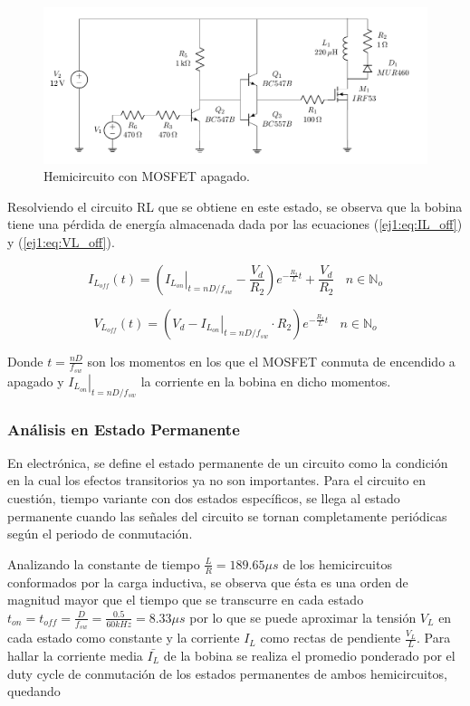 \begin{figure}[H]
	\centering
	\includegraphics[width=0.4\linewidth, page=2]{ImagenesEjercicio-1/CircuitsEj1}
	\caption{Hemicircuito con MOSFET apagado.}
	\label{ej1:fig:circuito_off}
\end{figure}

Resolviendo el circuito RL que se obtiene en este estado, se observa que la bobina tiene una pérdida de energía almacenada dada por las ecuaciones (\ref{ej1:eq:IL_off}) y (\ref{ej1:eq:VL_off}).

\begin{equation}
	 I_{L_{off}}(t) = \left( \left. I_{L_{on}} \right|_{t= nD/f_{sw}} -\frac{V_d}{R_2}\right) e^{-\frac{R_2}{L}t} + \frac{V_d}{R_2} \ \ \ \ n \in \mathbb{N}_o
\label{ej1:eq:IL_off}
\end{equation}

\begin{equation}
	 V_{L_{off}}(t) = \left( V_d - \left. I_{L_{on}} \right|_{t= nD/f_{sw}} \cdot R_2 \right)e^{-\frac{R_2}{L}t} \ \ \ \ n \in \mathbb{N}_o
\label{ej1:eq:VL_off}
\end{equation}

Donde $t=\frac{nD}{f_{sw}}$ son los momentos en los que el MOSFET conmuta de encendido a apagado y $\left. I_{L_{on}} \right|_{t= nD/f_{sw}}$ la corriente en la bobina en dicho momentos. 

\subsubsection{Análisis en Estado Permanente}

En electrónica, se define el estado permanente de un circuito como la condición en la cual los efectos transitorios ya no son importantes. Para el circuito en cuestión, tiempo variante con dos estados específicos, se llega al estado permanente cuando las señales del circuito se tornan completamente periódicas según el periodo de conmutación. 

Analizando la constante de tiempo $\frac{L}{R} = 189.65\mu s$ de los hemicircuitos conformados por la carga inductiva, se observa que ésta es una orden de magnitud mayor que el tiempo que se transcurre en cada estado $t_{on} = t_{off} = \frac{D}{f_{sw}} = \frac{0.5}{60kHz} = 8.33\mu s$ por lo que se puede aproximar la tensión $V_L$ en cada estado como constante y la corriente $I_L$ como rectas de pendiente $\frac{V_L}{L}$. Para hallar la corriente media $\bar{I_L}$ de la bobina se realiza el promedio ponderado por el duty cycle de conmutación de los estados permanentes de ambos hemicircuitos, quedando

